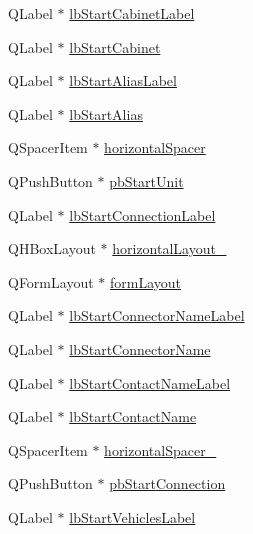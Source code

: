 \begin{DoxyCompactItemize}
Q\-Label $\ast$ \hyperlink{class_ui__mdt_cl_unit_link_dialog_aec94e9584ce6254e143c71d06c219dbe}{lb\-Start\-Cabinet\-Label}
\item 
Q\-Label $\ast$ \hyperlink{class_ui__mdt_cl_unit_link_dialog_a1bd88ffdb86f483a98b1932714f55e96}{lb\-Start\-Cabinet}
\item 
Q\-Label $\ast$ \hyperlink{class_ui__mdt_cl_unit_link_dialog_a4c469cefd7c39afa074f9cafb81f241f}{lb\-Start\-Alias\-Label}
\item 
Q\-Label $\ast$ \hyperlink{class_ui__mdt_cl_unit_link_dialog_aaeb0e65da0b05b329fbb191c58b37fed}{lb\-Start\-Alias}
\item 
Q\-Spacer\-Item $\ast$ \hyperlink{class_ui__mdt_cl_unit_link_dialog_a2e167d28ef808fb7362980f139c56a12}{horizontal\-Spacer}
\item 
Q\-Push\-Button $\ast$ \hyperlink{class_ui__mdt_cl_unit_link_dialog_acd5fed0c4505ea55bbd9d1702aeaa772}{pb\-Start\-Unit}
\item 
Q\-Label $\ast$ \hyperlink{class_ui__mdt_cl_unit_link_dialog_aeba7f4367ee88356d7e0813a96ead4b8}{lb\-Start\-Connection\-Label}
\item 
Q\-H\-Box\-Layout $\ast$ \hyperlink{class_ui__mdt_cl_unit_link_dialog_a890e443f4efd50ec7387451fc527b843}{horizontal\-Layout\-\_}
\item 
Q\-Form\-Layout $\ast$ \hyperlink{class_ui__mdt_cl_unit_link_dialog_a0515f1c71b7504f718835d9fe91ea18f}{form\-Layout}
\item 
Q\-Label $\ast$ \hyperlink{class_ui__mdt_cl_unit_link_dialog_a9219d9d5d753c3f26563b414731af03c}{lb\-Start\-Connector\-Name\-Label}
\item 
Q\-Label $\ast$ \hyperlink{class_ui__mdt_cl_unit_link_dialog_aec7e5b510093d38360ec876841994d43}{lb\-Start\-Connector\-Name}
\item 
Q\-Label $\ast$ \hyperlink{class_ui__mdt_cl_unit_link_dialog_a3d09a922611ccd01bc0851ee0090445b}{lb\-Start\-Contact\-Name\-Label}
\item 
Q\-Label $\ast$ \hyperlink{class_ui__mdt_cl_unit_link_dialog_a7c8f325f510ce4acdce55ec87ef06238}{lb\-Start\-Contact\-Name}
\item 
Q\-Spacer\-Item $\ast$ \hyperlink{class_ui__mdt_cl_unit_link_dialog_adb015c7d7ae952a36b60e9b34a1b520e}{horizontal\-Spacer\-\_}
\item 
Q\-Push\-Button $\ast$ \hyperlink{class_ui__mdt_cl_unit_link_dialog_ad3c8e8763cd7e3385df04239a7b2361c}{pb\-Start\-Connection}
\item 
Q\-Label $\ast$ \hyperlink{class_ui__mdt_cl_unit_link_dialog_a0a3f9dba0fb11d412595cbae06f1aaa4}{lb\-Start\-Vehicles\-Label}

\end{DoxyCompactItemize}
